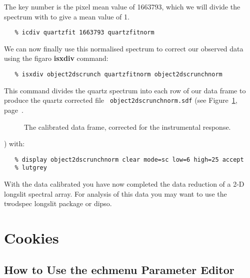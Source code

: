 \documentclass[twoside,11pt]{article}
\newcommand{\stardocinitials}  {SC}
\newcommand{\stardocnumber}    {7.2}
\newcommand{\stardocname}{\stardocinitials /\stardocnumber}
\newcommand{\xref}[3]{#1}
\newcommand{\xlabel}[1]{}
\newcommand{\mlabel}[1]{\xlabel{#1}\label{#1}}
\newcommand{\scspec}[2]{#1}
\newcommand{\scspec}[2]{#2}
\begin{document}
The key number is the pixel mean value of 1663793, which we will
divide the spectrum with to give a mean value of 1.

{\scspec{\small}{ }
\begin{verbatim}
   % icdiv quartzfit 1663793 quartzfitnorm
\end{verbatim}
}

We can now finally use this normalised spectrum to correct our
observed data using the \xref{{\sc figaro}}{sun86}{}
\xref{{\bf isxdiv}}{sun86}{ISXDIV} command:

{\scspec{\small}{ }
\begin{verbatim}
   % isxdiv object2dscrunch quartzfitnorm object2dscrunchnorm
\end{verbatim}
}

This command divides the quartz spectrum into each row of our data
frame to produce the quartz corrected file {\tt
object2dscrunchnorm.sdf} (see \scspec{Figure~\ref{finalcal},
page~\pageref{finalcal}.}{the figure below.}

\begin{figure}
\begin{center}
  \scspec{\leavevmode\epsfysize=105mm\epsfbox{sc7_21.eps}}
          {\leavevmode\epsfysize=136mm}

  \parbox{140mm}{
    \caption{The calibrated data frame, corrected for the instrumental 
             response.}
    \label{finalcal}
  }
\end{center}
\end{figure}
 ) with:  

{
\scspec{\small}{ }
\begin{verbatim}
   % display object2dscrunchnorm clear mode=sc low=6 high=25 accept
   % lutgrey
\end{verbatim}
}


With the data calibrated you have now completed the data reduction of
a 2-D longslit spectral array. For analysis of this data you may want
to use the \xref{{\sc twodspec}}{sun16}{}\cite{twodspec} {\sc
longslit} package or \xref{{\sc dipso}}{sun50}{}\cite{dipso}.


\section{\mlabel{cookies}Cookies}
\markboth{Cookies}{\stardocname}

\subsection{\mlabel{cook_parameter_editor}How to Use the {\bf echmenu}
            Parameter Editor}
\end{document}
